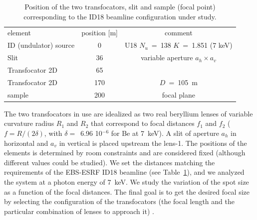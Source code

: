 \documentclass{iucr}              %
\begin{document}
\begin{table}[]
    \label{table:id18parameters}
    \caption{Position of the two transfocators, slit and sample (focal point) corresponding to the ID18 beamline configuration under study. }
    \centering
    \begin{tabular}{l|c|c}
         element & position [m] & comment\\
         ID (undulator) source& 0 & U18 $N_u$~=~138 $K$~=~1.851 (7 keV)\\
         Slit & 36 &
         variable aperture $a_h\times a_v$
         \\
         Transfocator 2D & 65 & 
         \\
         Transfocator 2D & 170 & $D$~=~\SI{105}{\meter} \\
         sample & 200 & focal plane
    \end{tabular}


\end{table}

The two transfocators in use are idealized as two real beryllium lenses of variable curvature radius $R_1$ and $R_2$ that correspond to focal distances $f_1$ and $f_2$ ($f=R/(2 \delta)$, with $\delta=$~6.96 10$^{-6}$ for Be at \SI{7}{keV}). A slit of aperture $a_h$ in horizontal and $a_v$ in vertical is placed upstream the lens-1. The positions of the elements is determined by room constraints and are considered fixed (although different values could be studied). We set the distances matching the requirements of the EBS-ESRF ID18 beamline (see Table~\ref{table:id18parameters}), and we analyzed the system at a photon energy of \SI{7}{keV}. We study the variation of the spot size as a function of the focal distances. The final goal is to get the desired focal size by selecting the configuration of the transfocators (the focal length and the particular combination of lenses to approach it) . 
\end{document}
